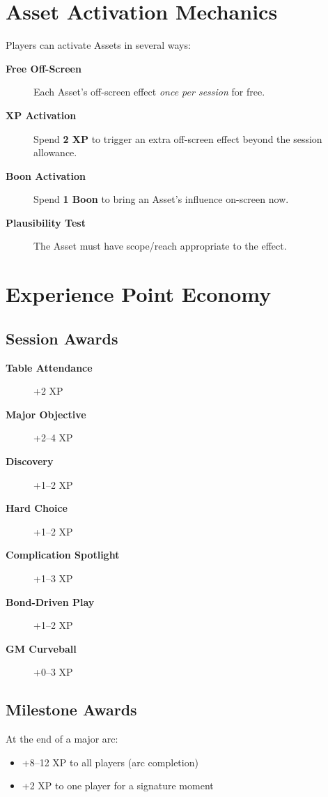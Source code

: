 \section{Asset Activation Mechanics}
\label{sec:asset-activations}
Players can activate Assets in several ways:
\begin{description}
\item[\textbf{Free Off-Screen}] Each Asset's off-screen effect \emph{once per session} for free. 
\item[\textbf{XP Activation}] Spend \textbf{2 XP} to trigger an extra off-screen effect beyond the session allowance. 
\item[\textbf{Boon Activation}] Spend \textbf{1 Boon} to bring an Asset's influence on-screen now. 
\item[\textbf{Plausibility Test}] The Asset must have scope/reach appropriate to the effect. 
\end{description}

\section{Experience Point Economy}
\label{sec:xp-economy}

\subsection{Session Awards}
\label{subsec:session-awards}
\begin{description}
\item[\textbf{Table Attendance}] +2 XP
\item[\textbf{Major Objective}] +2–4 XP
\item[\textbf{Discovery}] +1–2 XP
\item[\textbf{Hard Choice}] +1–2 XP
\item[\textbf{Complication Spotlight}] +1–3 XP
\item[\textbf{Bond-Driven Play}] +1–2 XP
\item[\textbf{GM Curveball}] +0–3 XP
\end{description}

\subsection{Milestone Awards}
\label{subsec:milestone-awards}
At the end of a major arc:
\begin{itemize}
\item +8–12 XP to all players (arc completion)
\item +2 XP to one player for a signature moment
\end{itemize}

